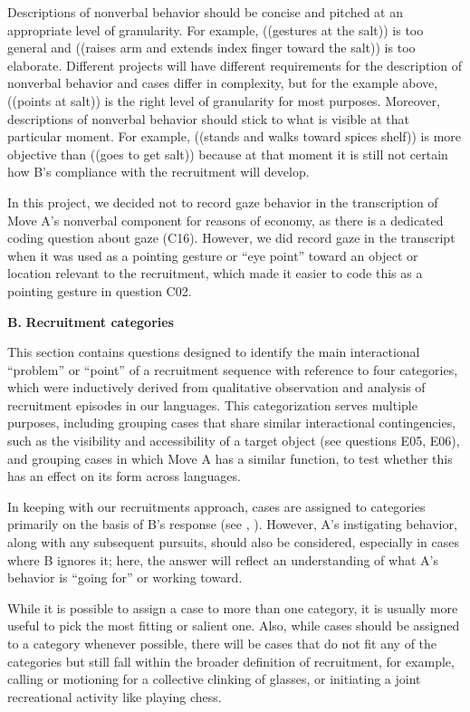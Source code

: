 \documentclass[output=paper]{langsci/langscibook}
\begin{document}
\begin{description}
Descriptions of nonverbal behavior should be concise and pitched at an appropriate level of granularity. For example, ((gestures at the salt)) is too general and ((raises arm and extends index finger toward the salt)) is too elaborate. Different projects will have different requirements for the description of nonverbal behavior and cases differ in complexity, but for the example above, ((points at salt)) is the right level of granularity for most purposes. Moreover, descriptions of nonverbal behavior should stick to what is visible at that particular moment. For example, ((stands and walks toward spices shelf)) is more objective than ((goes to get salt)) because at that moment it is still not certain how B’s compliance with the recruitment will develop.

  In this project, we decided not to record gaze behavior in the transcription of Move A’s nonverbal component for reasons of economy, as there is a dedicated coding question about gaze (C16). However, we did record gaze in the transcript when it was used as a pointing gesture or “eye point” \citep{Wilkins2003} toward an object or location relevant to the recruitment, which made it easier to code this as a pointing gesture in question C02.
\end{description}

\noindent \textbf{B.} \textbf{Recruitment categories} 

\medskip

\noindent This section contains questions designed to identify the main interactional “problem” or “point” of a recruitment sequence with reference to four categories, which were inductively derived from qualitative observation and analysis of recruitment episodes in our languages. This categorization serves multiple purposes, including grouping cases that share similar interactional contingencies, such as the visibility and accessibility of a target object (see questions E05, E06), and grouping cases in which Move A has a similar function, to test whether this has an effect on its form across languages.

In keeping with our recruitments approach, cases are assigned to categories primarily on the basis of B’s response (see , ). However, A’s instigating behavior, along with any subsequent pursuits, should also be considered, especially in cases where B ignores it; here, the answer will reflect an understanding of what A’s behavior is “going for” or working toward.

While it is possible to assign a case to more than one category, it is usually more useful to pick the most fitting or salient one. Also, while cases should be assigned to a category whenever possible, there will be cases that do not fit any of the categories but still fall within the broader definition of recruitment, for example, calling or motioning for a collective clinking of glasses, or initiating a joint recreational activity like playing chess.
\end{document}
